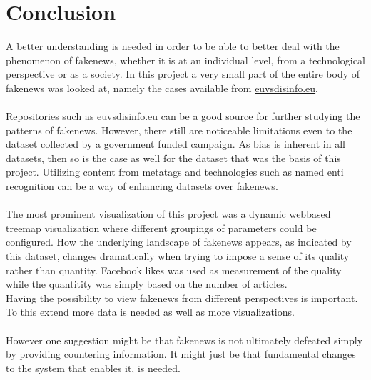 \documentclass{article}
\begin{document}
\section{Conclusion}
A better understanding is needed in order to be able to better deal with the phenomenon of fakenews, whether it is at an individual level, from a technological perspective or as a society. In this project a very small part of the entire body of fakenews was looked at, namely the cases available from \href{https://euvsdisinfo.eu}{euvsdisinfo.eu}.
\\\\
Repositories such as \href{https://euvsdisinfo.eu}{euvsdisinfo.eu} can be a good source for further studying the patterns of fakenews. However, there still are noticeable limitations even to the dataset collected by a government funded campaign. As bias is inherent in all datasets, then so is the case as well for the dataset that was the basis of this project. Utilizing content from metatags and technologies such as named enti recognition can be a way of enhancing datasets over fakenews.
\\\\
The most prominent visualization of this project was a dynamic webbased treemap visualization where different groupings of parameters could be configured. How the underlying landscape of fakenews appears, as indicated by this dataset, changes dramatically when trying to impose a sense of its quality rather than quantity. Facebook likes was used as measurement of the quality while the quantitity was simply based on the number of articles.\\
Having the possibility to view fakenews from different perspectives is important. To this extend more data is needed as well as more visualizations.
\\\\
However one suggestion might be that fakenews is not ultimately defeated simply by providing countering information. It might just be that fundamental changes to the system that enables it, is needed.
\newpage


\end{document}
